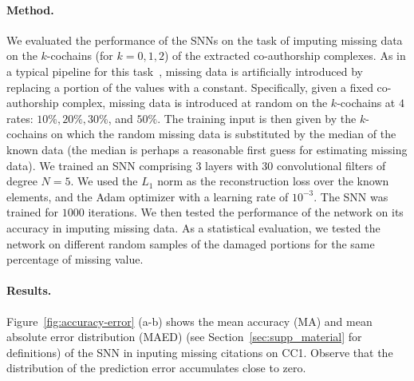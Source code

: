 \paragraph{Method.}
We evaluated the performance of the SNNs on the task of imputing missing data on the $k$-cochains (for $k=0,1,2$) of the extracted co-authorship complexes. As in a typical pipeline for this task~\cite{nelwamondo2007missing}, missing data is artificially introduced by replacing a portion of the values with a constant. Specifically, given a fixed co-authorship complex, missing data is introduced at random on the $k$-cochains at $4$ rates: $10\%,  20\%,  30\%$, and $50\%$. The training input is then given by the $k$-cochains on which the random missing data is substituted by the median of the known data (the median is perhaps a reasonable first guess for estimating missing data). We trained an SNN comprising $3$ layers with $30$ convolutional filters of degree $N=5$. We used the $L_1$ norm as the reconstruction loss over the known elements, and the Adam optimizer with a learning rate of $10^{-3}$. The SNN was trained for $1000$ iterations. We then tested the performance of the network on its accuracy in imputing missing data. As a statistical evaluation, we tested the network on different random samples of the damaged portions for the same percentage of missing value.

\paragraph{Results.}
Figure~\ref{fig:accuracy-error} (a-b) shows the mean accuracy (MA) and mean absolute error distribution (MAED)  (see Section~\ref{sec:supp_material} for definitions) of the SNN in inputing missing citations on CC1. Observe that the distribution of the prediction error accumulates close to zero.

